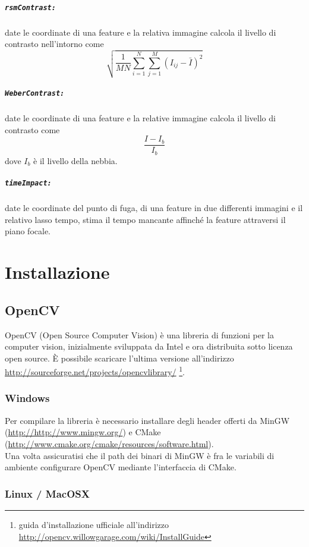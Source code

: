 \documentclass[12pt]{report}
\begin{document}
\paragraph*{\verb_rsmContrast:_} date le coordinate di una feature e la relativa immagine calcola il livello di contrasto nell'intorno come $$\sqrt{\frac{1}{MN}\sum_{i=1}^N\sum_{j=1}^M(I_{ij}-\bar{I})^2}$$
\paragraph*{\verb_WeberContrast:_} date le coordinate di una feature e la relative immagine calcola il livello di contrasto come $$\frac{I-I_b}{I_b}$$ dove $I_b$ \`e il livello della nebbia.

\paragraph*{\verb_timeImpact:_} date le coordinate del punto di fuga, di una feature in due differenti immagini e il relativo lasso tempo, stima il tempo mancante affinch\'e la feature attraversi il piano focale. %

\chapter{Installazione}
\section{OpenCV}
OpenCV (Open Source Computer Vision) \`e una libreria di funzioni per la computer vision, inizialmente sviluppata da Intel e ora distribuita sotto licenza open source. \`E possibile scaricare l'ultima versione all'indirizzo \url{http://sourceforge.net/projects/opencvlibrary/} \footnote{guida d'installazione ufficiale all'indirizzo \url{http://opencv.willowgarage.com/wiki/InstallGuide}}.

\subsection{Windows}
Per compilare la libreria \`e necessario installare degli header offerti da MinGW (\url{http://http://www.mingw.org/}) e CMake (\url{http://www.cmake.org/cmake/resources/software.html}).\\
\noindent Una volta assicuratisi che il path dei binari di MinGW \`e fra le variabili di ambiente configurare OpenCV mediante l'interfaccia di CMake.

\subsection{Linux / MacOSX}
\end{document}
